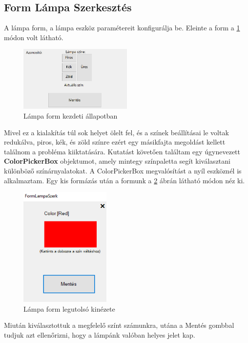 \documentclass[tocnopagenum]{thesis-ekf}
\theoremstyle{definition}
\theoremstyle{remark}
\begin{document}
	\subsection{Form Lámpa Szerkesztés}
	A lámpa form, a lámpa eszköz paramétereit konfigurálja be. Eleinte a form a \ref{fig:lampaformKezd} módon volt látható.
	\begin{figure}[H]	
		\centering
		\includegraphics[page=1,width=0.5\textwidth]{lamp_form}
		\caption[Lámpa form kezdeti állapotban]{Lámpa form kezdeti állapotban}
		\label{fig:lampaformKezd}
	\end{figure}
	Mivel ez a kialakítás túl sok helyet ölelt fel, és a színek beállításai le voltak redukálva, piros, kék, és zöld színre ezért egy másikfajta megoldást kellett találnom a probléma kiiktatására.
	Kutatást követően találtam egy úgynevezett \textbf{ColorPickerBox} objektumot, amely mintegy színpaletta segít kiválasztani különböző színárnyalatokat. A ColorPickerBox megvalósítást a nyíl eszköznél is alkalmaztam.
	Egy kis formázás után a formunk a \ref{fig:lampaformveg} ábrán látható módon néz ki.
	\begin{figure}[H]	
		\centering
		\includegraphics[page=1,width=0.4\textwidth]{LampaSzerk}
		\caption[Lámpa form legutolsó kinézete]{Lámpa form legutolsó kinézete}
		\label{fig:lampaformveg}
	\end{figure}
	Miután kiválasztottuk a megfelelő színt számunkra, utána a Mentés gombbal tudjuk azt ellenőrizni, hogy a lámpánk valóban helyes jelet kap.
\end{document}
